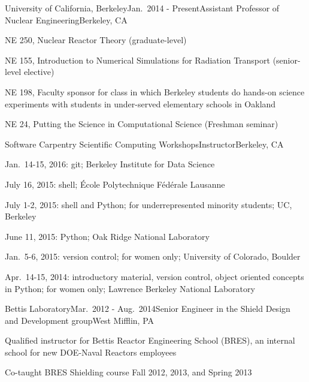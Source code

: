 \begin{rSubsection}{University of California, Berkeley}{Jan.\ 2014 - Present}{Assistant Professor of Nuclear Engineering}{Berkeley, CA}
\item NE 250, Nuclear Reactor Theory (graduate-level)
\item NE 155, Introduction to Numerical Simulations for Radiation Transport (senior-level elective)
\item NE 198, Faculty sponsor for class in which Berkeley students do hands-on science experiments with students in under-served elementary schools in Oakland
\item NE 24, Putting the Science in Computational Science (Freshman seminar)
\end{rSubsection}


\begin{rSubsection}{Software Carpentry Scientific Computing Workshops}{}{Instructor}{Berkeley, CA}
\item Jan.\ 14-15, 2016: git; Berkeley Institute for Data Science
\item July 16, 2015: shell; \'{E}cole Polytechnique F\'{e}d\'{e}rale Lausanne
\item July 1-2, 2015: shell and Python; for underrepresented minority students; UC, Berkeley
\item June 11, 2015: Python; Oak Ridge National Laboratory
\item Jan.\ 5-6, 2015: version control; for women only; University of Colorado, Boulder
\item Apr.\ 14-15, 2014: introductory material, version control, object oriented concepts in Python; for women only; Lawrence Berkeley National Laboratory
\end{rSubsection}



\begin{rSubsection}{Bettis Laboratory}{Mar.\ 2012 - Aug.\ 2014}{Senior Engineer in the Shield Design and Development group}{West Mifflin, PA}
\item Qualified instructor for Bettis Reactor Engineering School (BRES), an internal school for new DOE-Naval Reactors employees
\item Co-taught BRES Shielding course Fall 2012, 2013, and Spring 2013
\end{rSubsection}


